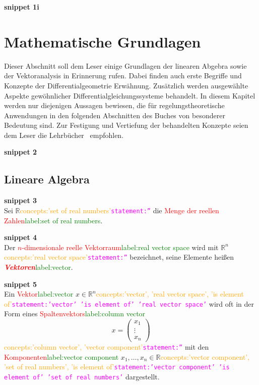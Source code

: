 \documentclass[a4paper,twoside,english,ngerman,deutsch,german,sectrefs,envcountsame,envcountchap]{svmono}
\newcommand{\setref}[2]{\textcolor{red}{#1}\textcolor{green}{#2}}
\newcommand{\snippet}[1]{\textbf{snippet #1}\\}
\newcommand{\eqnote}[2]{\textcolor{orange}{#1}\textcolor{magenta}{\texttt{#2}}}
\begin{document}
\snippet{1i}


\chapter{Mathematische Grundlagen\label{cha:Grundlagen}}
Dieser Abschnitt soll dem Leser einige Grundlagen der linearen Abgebra sowie der Vektoranalysis in Erinnerung rufen. Dabei finden auch erste Begriffe und Konzepte der Differentialgeometrie Erwähnung. Zusätzlich werden ausgewählte Aspekte gewöhnlicher Differentialgleichungssysteme behandelt. In diesem Kapitel werden nur diejenigen Aussagen bewiesen, die für regelungstheoretische Anwendungen in den folgenden Abschnitten des Buches von besonderer Bedeutung sind. Zur Festigung und Vertiefung der behandelten Konzepte seien dem Leser die Lehrbücher~\cite{arnold2001,kerner2007} empfohlen.


\snippet{2}


\section{Lineare Algebra\label{sec:Lineare-Algebra}}


\snippet{3}
Sei ${\mathbb{R}}$\eqnote{concepts:'set of real numbers'}{statement:''} die \setref{Menge der reellen Zahlen}{label:set of real numbers}.

\snippet{4}
Der \setref{$n$-dimensionale reelle Vektorraum}{label:real vector space} wird mit ${\mathbb{R}}^{n}$\eqnote{concepts:'real vector space'}{statement:''} bezeichnet, seine Elemente heißen \setref{\textbf{\em Vektoren}}{label:vector}.

\snippet{5}
Ein \setref{Vektor}{label:vector} $x\in{\mathbb{R}}^{n}$\eqnote{concepts:'vector', 'real vector space', 'is element of'}{statement:'vector' 'is element of' 'real vector space'} wird oft in der Form eines \setref{Spaltenvektors}{label:column vector}
\begin{equation}
x=\left(\begin{array}{c} x_{1}\\
\vdots\\
x_{n}
\end{array}\right)\label{eq:vektor-x}
\end{equation}\eqnote{concepts:'column vector', 'vector component'}{statement:''}
mit den \setref{Komponenten}{label:vector component} $x_{1},\ldots,x_{n}\in{\mathbb{R}}$\eqnote{concepts:'vector component', 'set of real numbers', 'is element of'}{statement:'vector component' 'is element of' 'set of real numbers'} dargestellt.
\end{document}
